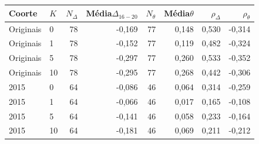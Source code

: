 \begin{tabular}{llrrrrrr}
\toprule
Coorte & $K$ & $N_\Delta$ & Média$\Delta_{16-20}$ & $N_\theta$ & Média$\theta$ & $\rho_\Delta$ & $\rho_\theta$\\
\midrule
Originais & 0 & 78 & -0,169 & 77 & 0,148 & 0,530 & -0,314\\
Originais & 1 & 78 & -0,152 & 77 & 0,119 & 0,482 & -0,324\\
Originais & 5 & 78 & -0,297 & 77 & 0,260 & 0,533 & -0,352\\
Originais & 10 & 78 & -0,295 & 77 & 0,268 & 0,442 & -0,306\\
2015 & 0 & 64 & -0,086 & 46 & 0,064 & 0,314 & -0,259\\
2015 & 1 & 64 & -0,066 & 46 & 0,017 & 0,165 & -0,108\\
2015 & 5 & 64 & -0,141 & 46 & 0,058 & 0,233 & -0,164\\
2015 & 10 & 64 & -0,181 & 46 & 0,069 & 0,211 & -0,212\\
\bottomrule
\end{tabular}
